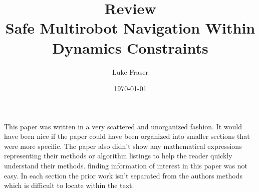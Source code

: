 \documentclass{article}
\begin{document}
\title{{\large Review} \\ Safe Multirobot Navigation Within Dynamics Constraints}
\author{Luke Fraser}
\date{\today}
\maketitle

\begingroup
\renewcommand{\section}[2]{}


\endgroup

\section*{Summary}

\section*{Strengths}

\section*{Critique}
This paper was written in a very scattered and unorganized fashion. It would have been nice if the paper could have been organized into smaller sections that were more specific. The paper also didn't show any mathematical expressions representing their methods or algorithm listings to help the reader quickly understand their methods. finding information of interest in this paper was not easy. In each section the prior work isn't separated from the authors methods which is difficult to locate within the text.
\cite{1677952}
\end{document}
